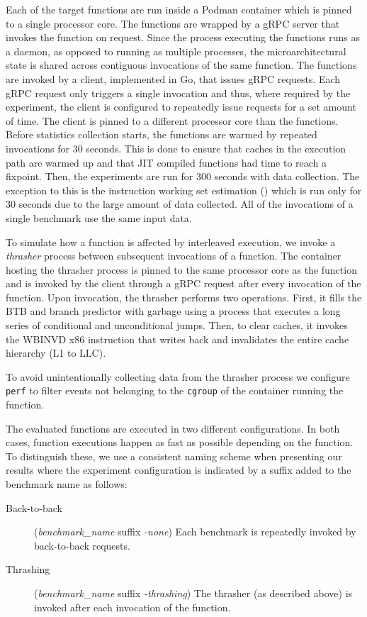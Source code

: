 Each of the target functions are run inside a Podman container which is pinned to a single processor core. The functions are wrapped by a gRPC server that invokes the function on request. Since the process executing the functions runs as a daemon, as opposed to running as multiple processes, the microarchitectural state is shared across contiguous invocations of the same function. The functions are invoked by a client, implemented in Go, that issues gRPC requests. Each gRPC request only triggers a single invocation and thus, where required by the experiment, the client is configured to repeatedly issue requests for a set amount of time. The client is pinned to a different processor core than the functions. Before statistics collection starts, the functions are warmed by repeated invocations for 30 seconds. This is done to ensure that caches in the execution path are warmed up and that JIT compiled functions had time to reach a fixpoint. Then, the experiments are run for 300 seconds with data collection. The exception to this is the instruction working set estimation () which is run only for 30 seconds due to the large amount of data collected. All of the invocations of a single benchmark use the same input data.

To simulate how a function is affected by interleaved execution, we invoke a \emph{thrasher} process between subsequent invocations of a function. The container hosting the thrasher process is pinned to the same processor core as the function and is invoked by the client through a gRPC request after every invocation of the function. Upon invocation, the thrasher performs two operations. First, it fills the BTB and branch predictor with garbage using a process \cite{serverless_state} that executes a long series of conditional and unconditional jumps. Then, to clear caches, it invokes the WBINVD x86 instruction that writes back and invalidates the entire cache hierarchy (L1 to LLC).

To avoid unintentionally collecting data from the thrasher process we configure \texttt{perf} to filter events not belonging to the \texttt{cgroup} of the container running the function.

The evaluated functions are executed in two different configurations. In both cases, function executions happen as fast as possible depending on the function. To distinguish these, we use a consistent naming scheme when presenting our results where the experiment configuration is indicated by a suffix added to the benchmark name as follows:
\begin{description}
\item[Back-to-back]  (\textit{benchmark\_name} suffix \textit{-none}) Each benchmark is repeatedly invoked by back-to-back requests.
\item[Thrashing] (\textit{benchmark\_name} suffix \textit{-thrashing})  The thrasher (as described above) is invoked after each invocation of the function.
\end{description}


